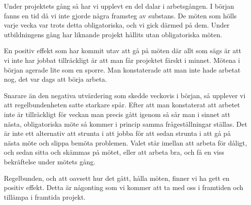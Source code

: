 Under projektets gång så har vi upplevt en del dalar i arbetsgången. I början fanns en tid då vi inte gjorde några framsteg av substans. De möten som hölls varje vecka var trots detta obligatoriska, och vi gick därmed på dem. Under utbildningens gång har liknande projekt hållits utan obligatoriska möten. 

En positiv effekt som har kommit utav att gå på möten där allt som sägs är att vi inte har jobbat tillräckligt är att man får projektet färskt i minnet. Mötena i början agerade lite som en sporre. Man konstaterade att man inte hade arbetat nog, det var dags att börja arbeta. 

Snarare än den negativa utvärdering som skedde veckovis i början, så upplever vi att regelbundenheten satte starkare spår. Efter att man konstaterat att arbetet inte är tillräckligt för veckan man precis gått igenom så sår man i sinnet att nästa, obligatoriska möte så kommer i princip samma frågeställningar ställas. Det är inte ett alternativ att strunta i att jobba för att sedan strunta i att gå på nästa möte och slippa bemöta problemen. Valet står imellan att arbeta för dåligt, och sedan sitta och skämmas på mötet, eller att arbeta bra, och få en viss bekräftelse under mötets gång. 

Regelbunden, och att oavsett hur det gått, hålla möten, finner vi ha gett en positiv effekt. Detta är någonting som vi kommer att ta med oss i framtiden och tillämpa i framtida projekt. 
